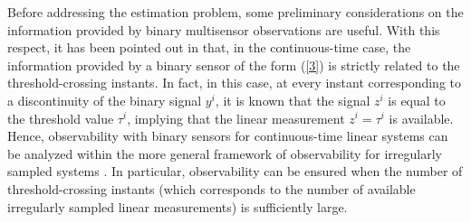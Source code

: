 \documentclass[11pt,journal,onecolumn]{IEEEtran}
\begin{document}
Before addressing the estimation problem, some preliminary considerations on the information provided by binary multisensor observations are useful. With this respect, it has been pointed out in \cite{Irr-sampling} that, in the continuous-time case, the information provided by a binary sensor of the form (\ref{3}) is strictly related to the threshold-crossing instants. In fact, in this case, at every instant corresponding to a discontinuity of the binary signal $y^i$, it is known that the signal $z^i$ is equal to the threshold value $\tau^{i}$, implying that the linear measurement $z^i = \tau^i$ is available. Hence, observability with binary sensors for continuous-time linear systems can be analyzed within the more general framework of observability for irregularly sampled systems \cite{Irr-sampling}. In particular, observability can be ensured when the number of threshold-crossing instants (which corresponds to the number of available irregularly sampled linear measurements) is sufficiently large.
\end{document}
